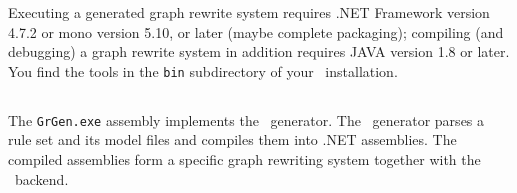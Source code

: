 Executing a generated graph rewrite system requires .NET Framework\cite{NET} version 4.7.2 or mono\cite{MONO} version 5.10, or later (maybe complete packaging); compiling (and debugging) a graph rewrite system in addition requires JAVA\cite{JAVA} version 1.8 or later. 
You find the tools in the \texttt{bin} subdirectory of your \GrG\ installation.

\subsection{\texttt{}} \label{grgenoptions}

\noindent The \texttt{GrGen.exe} assembly implements the \GrG\ generator.
The \GrG\ generator parses a rule set and its model files and compiles them into .NET assemblies.
The compiled assemblies form a specific graph rewriting system together with the \GrG\ backend.

